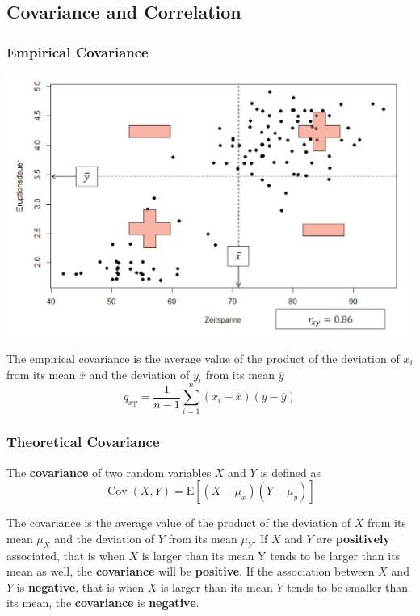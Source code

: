 \documentclass[11pt]{article}
\theoremstyle{definition}
\newcommand*\samplemean[1]{\overline{#1}}
\newcommand*\ev[1]{\mathrel{\text{E}\left[#1\right]}}
\newcommand*\Cov[1]{\mathop{\text{Cov}}\left(#1\right)}
\begin{document}
\subsection{Covariance and Correlation}

\subsubsection{Empirical Covariance}
\begin{minipage}{0.4\linewidth}
	\begin{center}
		\includegraphics[width=0.9\linewidth]{img/empirical_covariance}
	\end{center}
\end{minipage}
\begin{minipage}{0.6\linewidth}
	The empirical covariance is the average value of the product of the deviation of $x_i$ from its mean $\samplemean{x}$ and the deviation of $y_i$ from its mean $\samplemean{y}$
	\begin{equation*}
		q_{xy} = \frac{1}{n-1}\sum_{i=1}^{n}(x_i - \samplemean{x} )(y-\samplemean{y})
	\end{equation*}
\end{minipage}

\subsubsection{Theoretical Covariance}
\begin{definition}
	The \textbf{covariance} of two random variables $X$ and $Y$ is defined as
	\begin{equation*}
		\Cov{X,Y} = \ev{(X-\mu_x)(Y-\mu_y)}
	\end{equation*}
\end{definition}
The covariance is the average value of the product of the deviation of $X$ from its mean $\mu_X$ and the deviation of $Y$ from its mean $\mu_Y$. If $X$ and $Y$ are \textbf{positively} associated, that is when $X$ is larger than its mean Y tends to be larger than its mean as well, the \textbf{covariance} will be \textbf{positive}. If the association between $X$ and $Y$ is \textbf{negative}, that is when $X$ is larger than its mean $Y$ tends to be smaller than its mean, the \textbf{covariance} is \textbf{negative}.
\end{document}
